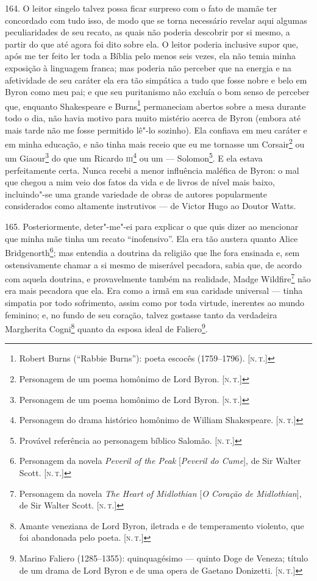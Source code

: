 164. O leitor singelo talvez possa ficar surpreso com o fato de mamãe
ter concordado com tudo isso, de modo que se torna necessário revelar
aqui algumas peculiaridades de seu recato, as quais não poderia
descobrir por si mesmo, a partir do que até agora foi dito sobre ela. O
leitor poderia inclusive supor que, após me ter feito ler toda a Bíblia
pelo menos seis vezes, ela não temia minha exposição à linguagem franca;
mas poderia não perceber que na energia e na afetividade de seu caráter
ela era tão simpática a tudo que fosse nobre e belo em Byron como meu
pai; e que seu puritanismo não excluía o bom senso de perceber que,
enquanto Shakespeare e Burns\footnote{Robert Burns (``Rabbie Burns''):
  poeta escocês (1759--1796). {[}\textsc{n.\,t.}{]}} permaneciam abertos sobre a
mesa durante todo o dia, não havia motivo para muito mistério acerca de
Byron (embora até mais tarde não me fosse permitido lê"-lo sozinho). Ela
confiava em meu caráter e em minha educação, e não tinha mais receio que
eu me tornasse um Corsair\footnote{Personagem de um poema homônimo de
  Lord Byron. {[}\textsc{n.\,t.}{]}} ou um Giaour\footnote{Personagem de um
  poema homônimo de Lord Byron. {[}\textsc{n.\,t.}{]}} do que um Ricardo
\textsc{iii}\footnote{Personagem do drama histórico homônimo de William
  Shakespeare. {[}\textsc{n.\,t.}{]}} ou um --- Solomon\footnote{Provável
  referência ao personagem bíblico Salomão. {[}\textsc{n.\,t.}{]}}. E ela
estava perfeitamente certa. Nunca recebi a menor influência maléfica de
Byron: o mal que chegou a mim veio dos fatos da vida e de livros de
nível mais baixo, incluindo"-se uma grande variedade de obras de autores
popularmente considerados como altamente instrutivos --- de Victor Hugo
ao Doutor Watts.

165. Posteriormente, deter"-me"-ei para explicar o que quis dizer ao
mencionar que minha mãe tinha um recato ``inofensivo''. Ela era tão
austera quanto Alice Bridgenorth\footnote{Personagem da novela
  \emph{Peveril of the Peak} {[}\emph{Peveril do Cume}{]}, de Sir Walter
  Scott. {[}\textsc{n.\,t.}{]}}; mas entendia a doutrina da religião que lhe
fora ensinada e, sem ostensivamente chamar a si mesmo de miserável
pecadora, sabia que, de acordo com aquela doutrina, e provavelmente
também na realidade, Madge Wildfire\footnote{Personagem da novela
  \emph{The Heart of Midlothian} {[}\emph{O Coração de Midlothian}{]},
  de Sir Walter Scott. {[}\textsc{n.\,t.}{]}} não era mais pecadora que ela.
Era como a irmã em sua caridade universal --- tinha simpatia por todo
sofrimento, assim como por toda virtude, inerentes ao mundo feminino; e,
no fundo de seu coração, talvez gostasse tanto da verdadeira Margherita
Cogni\footnote{Amante veneziana de Lord Byron, iletrada e de
  temperamento violento, que foi abandonada pelo poeta. {[}\textsc{n.\,t.}{]}}
quanto da esposa ideal de Faliero\footnote{Marino Faliero (1285--1355):
  quinquagésimo --- quinto Doge de Veneza; título de um drama de Lord
  Byron e de uma opera de Gaetano Donizetti. {[}\textsc{n.\,t.}{]}}.

